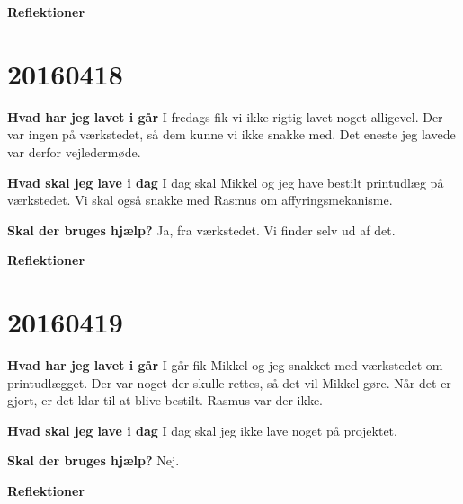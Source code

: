 \documentclass{article}
\begin{document}
	\textbf{Reflektioner}
	
	\section{20160418}
	
	\textbf{Hvad har jeg lavet i går}
	I fredags fik vi ikke rigtig lavet noget alligevel. Der var ingen på værkstedet, så dem kunne vi ikke snakke med. Det eneste jeg lavede var derfor vejledermøde.  
	
	\textbf{Hvad skal jeg lave i dag}
	I dag skal Mikkel og jeg have bestilt printudlæg på værkstedet. Vi skal også snakke med Rasmus om affyringsmekanisme. 
	
	\textbf{Skal der bruges hjælp?}
	Ja, fra værkstedet. Vi finder selv ud af det. 
	
	\textbf{Reflektioner}

	\section{20160419}
	
	\textbf{Hvad har jeg lavet i går}
	I går fik Mikkel og jeg snakket med værkstedet om printudlægget. Der var noget der skulle rettes, så det vil Mikkel gøre. Når det er gjort, er det klar til at blive bestilt. Rasmus var der ikke. 
	
	\textbf{Hvad skal jeg lave i dag}
	I dag skal jeg ikke lave noget på projektet. 
	
	\textbf{Skal der bruges hjælp?}
	Nej.  
	
	\textbf{Reflektioner}
	
\end{document}
